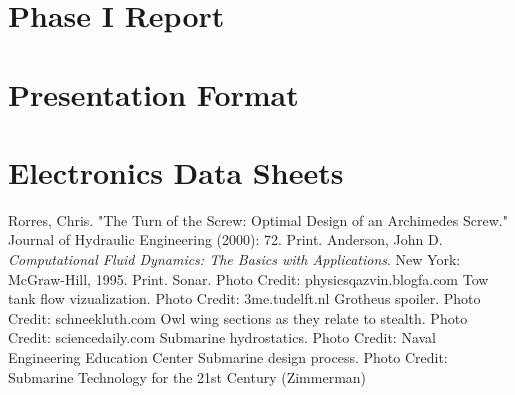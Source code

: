 \documentclass{report}
\begin{document}
\chapter{Phase I Report}
%
\chapter{Presentation Format}
\chapter{Electronics Data Sheets}
%
\begin{thebibliography}{9}
Rorres, Chris. "The Turn of the Screw: Optimal Design of an Archimedes Screw." Journal of Hydraulic Engineering (2000): 72. Print.
Anderson, John D. \textit{Computational Fluid Dynamics: The Basics with Applications}. New York: McGraw-Hill, 1995. Print.
Sonar. Photo Credit: physicsqazvin.blogfa.com
Tow tank flow vizualization. Photo Credit: 3me.tudelft.nl
Grotheus spoiler. Photo Credit: schneekluth.com
Owl wing sections as they relate to stealth. Photo Credit: sciencedaily.com
Submarine hydrostatics. Photo Credit: Naval Engineering Education Center
Submarine design process. Photo Credit: Submarine Technology for the 21st Century (Zimmerman) 
\end{thebibliography}
\end{document}
